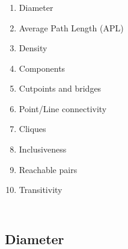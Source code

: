 \documentclass[8pt]{beamer}
\begin{document}

\begin{frame}
\frametitle{\insertsection}


\begin{columns}

\begin{enumerate}
\item Diameter
\item Average Path Length (APL)
\item Density
\item Components
\item Cutpoints and bridges
\item Point/Line connectivity
\item Cliques
\item Inclusiveness
\item Reachable pairs
\item Transitivity
\end{enumerate}


            
\end{columns}

\end{frame}

\subsection{Diameter}
\end{document}
